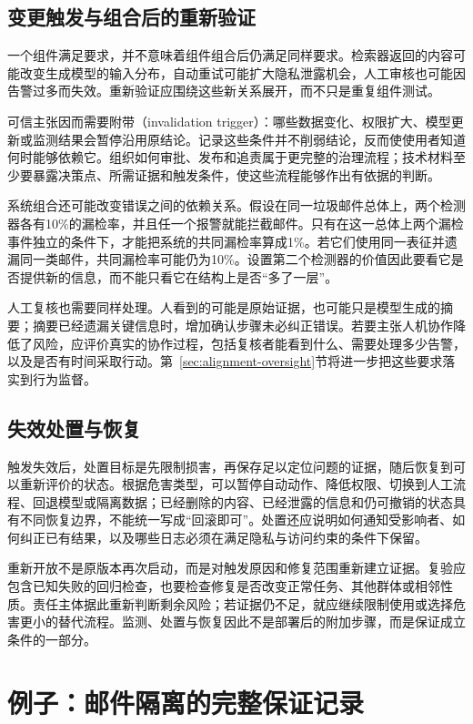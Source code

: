 \subsection{变更触发与组合后的重新验证}

一个组件满足要求，并不意味着组件组合后仍满足同样要求。检索器返回的内容可能改变生成模型的输入分布，自动重试可能扩大隐私泄露机会，人工审核也可能因告警过多而失效。重新验证应围绕这些新关系展开，而不只是重复组件测试。

可信主张因而需要附带（invalidation trigger）：哪些数据变化、权限扩大、模型更新或监测结果会暂停沿用原结论。记录这些条件并不削弱结论，反而使使用者知道何时能够依赖它。组织如何审批、发布和追责属于更完整的治理流程；技术材料至少要暴露决策点、所需证据和触发条件，使这些流程能够作出有依据的判断。

系统组合还可能改变错误之间的依赖关系。假设在同一垃圾邮件总体上，两个检测器各有10\%的漏检率，并且任一个报警就能拦截邮件。只有在这一总体上两个漏检事件独立的条件下，才能把系统的共同漏检率算成1\%。若它们使用同一表征并遗漏同一类邮件，共同漏检率可能仍为10\%。设置第二个检测器的价值因此要看它是否提供新的信息，而不能只看它在结构上是否“多了一层”。

人工复核也需要同样处理。人看到的可能是原始证据，也可能只是模型生成的摘要；摘要已经遗漏关键信息时，增加确认步骤未必纠正错误。若要主张人机协作降低了风险，应评价真实的协作过程，包括复核者能看到什么、需要处理多少告警，以及是否有时间采取行动。第~\ref{sec:alignment-oversight}节将进一步把这些要求落实到行为监督。

\subsection{失效处置与恢复}

触发失效后，处置目标是先限制损害，再保存足以定位问题的证据，随后恢复到可以重新评价的状态。根据危害类型，可以暂停自动动作、降低权限、切换到人工流程、回退模型或隔离数据；已经删除的内容、已经泄露的信息和仍可撤销的状态具有不同恢复边界，不能统一写成“回滚即可”。处置还应说明如何通知受影响者、如何纠正已有结果，以及哪些日志必须在满足隐私与访问约束的条件下保留。

重新开放不是原版本再次启动，而是对触发原因和修复范围重新建立证据。复验应包含已知失败的回归检查，也要检查修复是否改变正常任务、其他群体或相邻性质。责任主体据此重新判断剩余风险；若证据仍不足，就应继续限制使用或选择危害更小的替代流程。监测、处置与恢复因此不是部署后的附加步骤，而是保证成立条件的一部分。

\section{例子：邮件隔离的完整保证记录}
\label{sec:trust-mail-assurance}

